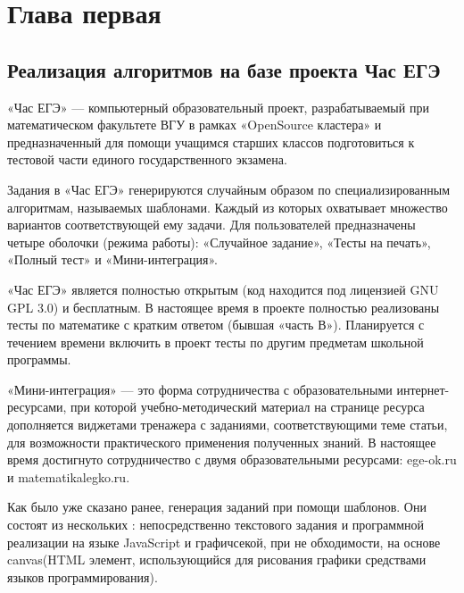 
\section{Глава первая}
\subsection{Реализация алгоритмов на базе проекта Час ЕГЭ}
«Час ЕГЭ» — компьютерный образовательный проект, разрабатываемый при математическом факультете ВГУ в рамках «OpenSource кластера» и предназначенный для помощи учащимся старших классов подготовиться к тестовой части единого государственного экзамена.

Задания в «Час ЕГЭ» генерируются случайным образом по специализированным алгоритмам, называемых шаблонами.
Каждый из которых охватывает множество вариантов соответствующей ему задачи. Для пользователей предназначены четыре оболочки (режима работы): «Случайное задание», «Тесты на печать», «Полный тест» и «Мини-интеграция».

«Час ЕГЭ» является полностью открытым (код находится под лицензией GNU GPL 3.0) и бесплатным.
В настоящее время в проекте полностью реализованы тесты по математике с кратким ответом (бывшая «часть В»).
Планируется с течением времени включить в проект тесты по другим предметам школьной программы.

«Мини-интеграция» — это форма сотрудничества с образовательными интернет-ресурсами, при которой учебно-методический материал на странице ресурса дополняется виджетами тренажера с заданиями, соответствующими теме статьи, для возможности практического применения полученных знаний.
В настоящее время достигнуто сотрудничество с двумя образовательными ресурсами: ege-ok.ru и matematikalegko.ru.

Как было уже сказано ранее, генерация заданий при помощи шаблонов. Они состоят из нескольких : непосредственно текстового задания и программной реализации на языке JavaScript и графичсекой, при не обходимости, на основе canvas(HTML элемент, использующийся для рисования графики средствами языков программирования).

